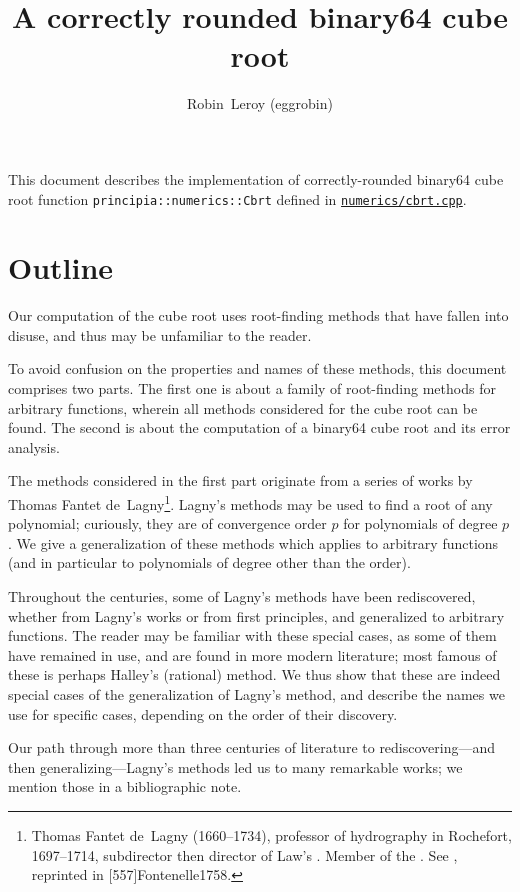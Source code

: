 ﻿\documentclass[10pt, a4paper, twoside]{basestyle}
\title{A correctly rounded binary64 cube root}
\date{\printdate{2021-06-21}}
\author{Robin~Leroy (eggrobin)}
\begin{document}
\maketitle
\noindent
This document describes the implementation of correctly-rounded binary64 cube root function {\texttt{principia::numerics::Cbrt}}
defined in \href{https://github.com/mockingbirdnest/Principia/blob/master/numerics/cbrt.cpp}{\texttt{numerics/cbrt.cpp}}.

\part*{Outline}

Our computation of the cube root uses root-finding methods that have fallen into disuse, and thus may be unfamiliar to the reader.

To avoid confusion on the properties and names of these methods, this document comprises two parts.
The first one is about a family of root-finding methods for arbitrary functions, wherein all methods
considered for the cube root can be found. The second is about the computation of a binary64 cube root and its error
analysis.

The methods considered in the first part originate from a series of works by Thomas Fantet de~Lagny\footnote{Thomas Fantet de~Lagny (1660--1734), professor
of hydrography in Rochefort, 1697--1714, subdirector then director of Law's .
Member of the . See \cite{Fontenelle1734}, reprinted in [557\psqq]{Fontenelle1758}.}. Lagny's methods
may be used to find a root of any polynomial; curiously, they are of convergence order $p$ for polynomials of degree $p$.
We give a generalization of these methods which applies to arbitrary functions (and in particular to polynomials
of degree other than the order).

Throughout the centuries, some of Lagny's methods have been rediscovered, whether from Lagny's works or from first principles,
and generalized to arbitrary functions. The reader may be familiar with these special cases, as some of them have remained in
use, and are found in more modern literature; most famous of these is perhaps Halley's (rational) method. We thus show that
these are indeed special cases of the generalization of Lagny's method, and describe the names we use for specific cases,
depending on the order of their discovery.

Our path through more than three centuries of literature to rediscovering---and then generalizing---Lagny's methods led us to
many remarkable works; we mention those in a bibliographic note.
\end{document}
